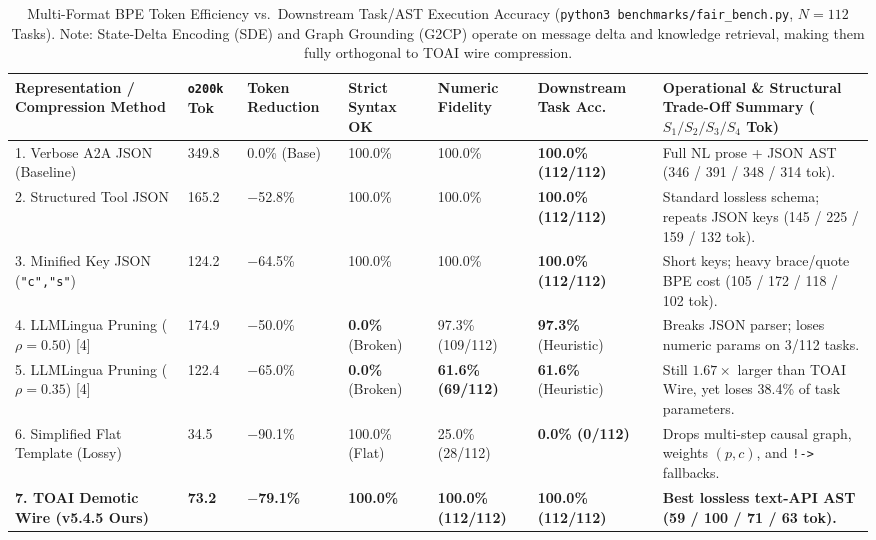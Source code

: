 \documentclass[9pt,a4paper]{extarticle}
\begin{document}
\begin{table}[h!]
\centering
\caption{Multi-Format BPE Token Efficiency vs.\ Downstream Task/AST Execution Accuracy (\texttt{python3 benchmarks/fair\_bench.py}, $N=112$ Tasks). Note: State-Delta Encoding (SDE) and Graph Grounding (G2CP) operate on message delta and knowledge retrieval, making them fully orthogonal to TOAI wire compression.}
\label{tab:fair_bench}
\footnotesize
\renewcommand{\arraystretch}{0.96}
\setlength{\tabcolsep}{2.5pt}
\begin{tabularx}{\textwidth}{L{3.6cm} R{1.3cm} R{1.6cm} C{1.6cm} C{1.7cm} C{1.8cm} Y}
\toprule
{}
\textbf{\color{white}Representation / Compression Method} &
\textbf{\color{white}\texttt{o200k} Tok} &
\textbf{\color{white}Token Reduction} &
\textbf{\color{white}Strict Syntax OK} &
\textbf{\color{white}Numeric Fidelity} &
\textbf{\color{white}Downstream Task Acc.} &
\textbf{\color{white}Operational \& Structural Trade-Off Summary ($S_1 / S_2 / S_3 / S_4$ Tok)} \\
. Verbose A2A JSON (Baseline) & 349.8 & 0.0\% (Base) & 100.0\% & 100.0\% & \textbf{100.0\% (112/112)} & Full NL prose + JSON AST (346 / 391 / 348 / 314 tok). \\
2. Structured Tool JSON & 165.2 & $-$52.8\% & 100.0\% & 100.0\% & \textbf{100.0\% (112/112)} & Standard lossless schema; repeats JSON keys (145 / 225 / 159 / 132 tok). \\
3. Minified Key JSON (\texttt{"c","s"}) & 124.2 & $-$64.5\% & 100.0\% & 100.0\% & \textbf{100.0\% (112/112)} & Short keys; heavy brace/quote BPE cost (105 / 172 / 118 / 102 tok). \\
4. LLMLingua Pruning ($\rho=0.50$) [4] & 174.9 & $-$50.0\% & \textbf{0.0\%} (Broken) & 97.3\% (109/112) & \textbf{97.3\%} (Heuristic) & Breaks JSON parser; loses numeric params on 3/112 tasks. \\
5. LLMLingua Pruning ($\rho=0.35$) [4] & 122.4 & $-$65.0\% & \textbf{0.0\%} (Broken) & \textbf{61.6\% (69/112)} & \textbf{61.6\%} (Heuristic) & Still $1.67\times$ larger than TOAI Wire, yet loses 38.4\% of task parameters. \\
6. Simplified Flat Template (Lossy) & 34.5 & $-$90.1\% & 100.0\% (Flat) & 25.0\% (28/112) & \textbf{0.0\% (0/112)} & Drops multi-step causal graph, weights $(p, c)$, and \texttt{!->} fallbacks. \\
\textbf{7. TOAI Demotic Wire (v5.4.5 Ours)} & \textbf{73.2} & \textbf{$-$79.1\%} & \textbf{100.0\%} & \textbf{100.0\% (112/112)} & \textbf{100.0\% (112/112)} & \textbf{Best lossless text-API AST (59 / 100 / 71 / 63 tok).} \\
\bottomrule
\end{tabularx}
\end{table}
\end{document}
